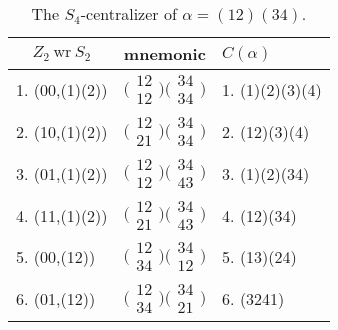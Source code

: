 \documentclass{surv-l}
\numberwithin{equation}{section}
\numberwithin{table}{section}
\numberwithin{figure}{section}
\theoremstyle{definition}
\begin{document}
\begin{table}
\caption{The $S_{4}$-centralizer of $\alpha=(12)(34)$.\label{tab4.12.1}}
{\begin{tabular}{|l|l|l|}
\hline
\multicolumn{1}{|c|}{$Z_{2}\  \mathrm{wr} \ S_{2}$}&   \multicolumn{1}{|c|}{mnemonic}& \multicolumn{1}{|l|}{$C(\alpha)$}   \\
\hline
1. (00,(1)(2)) &$\big(\!\begin{smallmatrix}12\\ 12\end{smallmatrix}\!\big) \big(\!\begin{smallmatrix}34\\ 34\end{smallmatrix}\!\big)$&1. (1)(2)(3)(4)\\[3pt]
2. (10,(1)(2))&$\big(\!\begin{smallmatrix}12\\ 21\end{smallmatrix}\!\big) \big(\!\begin{smallmatrix}34\\ 34\end{smallmatrix}\!\big)$&2. (12)(3)(4)\\[3pt]
3. (01,(1)(2))&$\big(\!\begin{smallmatrix}12\\ 12\end{smallmatrix}\!\big) \big(\!\begin{smallmatrix}34\\ 43\end{smallmatrix}\!\big)$&3. (1)(2)(34)\\[3pt]
4. (11,(1)(2))&$\big(\!\begin{smallmatrix}12\\ 21\end{smallmatrix}\!\big) \big(\!\begin{smallmatrix}34\\ 43\end{smallmatrix}\!\big)$&4. (12)(34)\\[3pt]
5. (00,(12))&$\big(\!\begin{smallmatrix}12\\ 34\end{smallmatrix}\!\big) \big(\!\begin{smallmatrix}34\\ 12\end{smallmatrix}\!\big)$&5. (13)(24)\\[3pt]
6. (01,(12))&$\big(\!\begin{smallmatrix}12\\ 34\end{smallmatrix}\!\big) \big(\!\begin{smallmatrix}34\\ 21\end{smallmatrix}\!\big)$&6. (3241)\\[3pt]

\end{tabular}}
\end{table}
\end{document}
